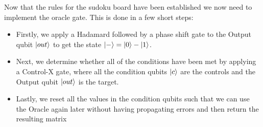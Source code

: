 \documentclass{article}
\begin{document}
Now that the rules for the sudoku board have been established we now need to implement the oracle gate. This is done in a few short steps:
\begin{itemize}
    \item Firstly, we apply a Hadamard followed by a phase shift gate to the Output qubit $\ket{out}$ to get the state $\ket{-} = \ket{0} - \ket{1}$.
    \item Next, we determine whether all of the conditions have been met by applying a Control-X gate, where all the condition qubits $\ket{c}$ are the controls and the Output qubit $\ket{out}$ is the target.
    \item Lastly, we reset all the values in the condition qubits such that we can use the Oracle again later without having propagating errors and then return the resulting matrix
\end{itemize}
\end{document}

